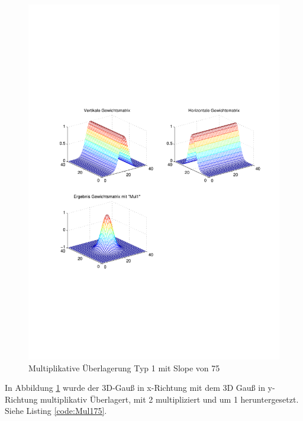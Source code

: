 \newpage
\begin{figure}[hbt]
	\centering
	\includegraphics[trim=70 211 42 242, clip, width=\linewidth]{./Bilder/Auswertung/GewichtmatrixEinzelschritte/Endergebnis_Gewichtsmatrix_Slope_75_Type_Mul1}
	\caption{Multiplikative Überlagerung Typ 1 mit Slope von 75}
	\label{Mul175}
\end{figure}

In Abbildung \ref{Mul175} wurde der 3D-Gauß in x-Richtung  mit dem 3D Gauß in y-Richtung multiplikativ Überlagert, mit 2 multipliziert und um 1 heruntergesetzt. Siehe Listing \ref{code:Mul175}.



